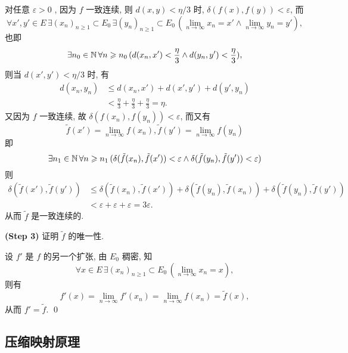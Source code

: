 \begin{Proof}
          对任意 $ \varepsilon>0 $ , 因为 $ f $ 一致连续, 则 $ d(x, y)<\eta/3 $ 时, $ \delta(f(x), f(y))<\varepsilon $, 而 
          \[
               \forall x', y'\in E\,\exists  (x_{n})_{n\geqslant1}\subset E_{0} \,\exists  (y_{n})_{n\geqslant1}\subset E_{0} \,(\lim_{n\to\infty}x_{n}=x'\wedge \lim_{n\to\infty}y_{n}=y' ), 
          \]  
          也即 
          \[
               \exists n_{0}\in\mathbb{N}\,\forall n\geqslant n_{0}\,(d(x_{n}, x')<\frac{\eta}{3}\wedge d(y_{n}, y')<\frac{\eta}{3}), 
          \] 
          则当 $ d(x', y')<\eta/3 $ 时, 有
          \[
               \begin{aligned}
                    d(x_{n}, y_{n}) & \leqslant d(x_{n}, x')+d(x', y')+d(y', y_{n})\\
                    & < \frac{\eta}{3}+\frac{\eta}{3}+\frac{\eta}{3}=\eta.
               \end{aligned}
          \]
          又因为 $ f $ 一致连续, 故 $ \delta(f(x_{n}), f(y_{n}))<\varepsilon $, 而又有
          \[
               \tilde{f}(x')=\lim_{n\to\infty}f(x_{n}), \tilde{f}(y')=\lim_{n\to\infty}f(y_{n})
          \]
          即
          \[
               \exists n_{1}\in\mathbb{N}\,\forall n\geqslant n_{1}\,(\delta(\tilde{f}(x_{n}), \tilde{f}(x'))<\varepsilon\wedge \delta(\tilde{f}(y_{n}), \tilde{f}(y'))<\varepsilon)
          \]
          则
          \[
               \begin{aligned}
                    \delta(\tilde{f}(x'), \tilde{f}(y')) & \leqslant \delta(\tilde{f}(x_{n}), \tilde{f}(x'))+\delta(\tilde{f}(y_{n}), \tilde{f}(x_{n}))+\delta(\tilde{f}(y_{n}), \tilde{f}(y'))\\
                    & <\varepsilon+\varepsilon+\varepsilon=3\varepsilon. 
               \end{aligned}
          \]
          从而 $ \tilde{f} $ 是一致连续的. 

          \textbf{(Step 3)} 证明 $ \tilde{f} $ 的唯一性. 

          
          设 $ {f}' $ 是 $ f $ 的另一个扩张, 由 $ E_{0} $ 稠密, 知
          \[
               \forall x\in E\,\exists (x_{n})_{n\geqslant1} \subset E_{0}\,(\lim_{n\to\infty}x_{n}=x),
          \]
          则有
          \[
               f'(x)=\lim_{n\to\infty}f'(x_{n})=\lim_{n\to\infty}f(x_{n})=\tilde{f}(x), 
          \]
          从而 $ f'=\tilde{f} $. \qed
     \end{Proof}

     \subsection{压缩映射原理}

